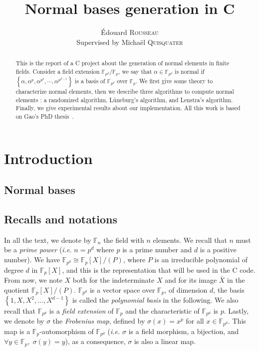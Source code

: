 \documentclass[a4paper,11pt]{article}
\title{Normal bases generation in C}
\author{Édouard \textsc{Rousseau}\\Supervised by Michaël \textsc{Quisquater}}
\theoremstyle{break}
\theoremstyle{sc}
\theoremstyle{definition}
\theoremstyle{remark}
\newcommand{\ie}{\emph{i.e. }}
\begin{document}
\maketitle

\begin{abstract}
  This is the report of a C project about the generation of normal elements in
  finite fields. Consider a field extension $\mathbb{F}_{p^d}/\mathbb{F}_p$, we
  say that $\alpha\in\mathbb{F}_{p^d}$ is normal if $\left\{
  \alpha,\alpha^p,\alpha^{p^2},\cdots,\alpha^{p^{d-1}} \right\}$ is a basis of
  $\mathbb{F}_{p^d}$ over $\mathbb{F}_p$. We first give some theory to
  characterize normal elements, then we describe three algorithms to compute
  normal elements : a randomized algorithm, Lüneburg's algorithm, and
  Lenstra's algorithm. Finally, we give experimental results about our
  implementation. All this work is based on Gao's PhD thesis~\cite{Ga93}.

\end{abstract}

\tableofcontents

\clearpage

\section{Introduction}
\subsection{Normal bases}
\subsection{Recalls and notations}
In all the text, we denote by $\mathbb{F}_n$ the field with $n$ elements. We
recall that $n$ must be a \emph{prime power} (\ie $n=p^d$ where $p$ is a prime
number and $d$ is a positive number). We have
$\mathbb{F}_{p^d}\cong\mathbb{F}_p[X]/(P)$, where $P$ is an irreducible
polynomial of degree $d$ in $\mathbb{F}_p[X]$, and this is the representation
that will be used in the C code. From now, we note
$X$ both for the indeterminate $X$ and for its image $\bar X$ in the
quotient $\mathbb{F}_p[X]/(P)$. $\mathbb{F}_{p^d}$ is a vector space over
$\mathbb{F}_p$, of dimension $d$, the basis $\left\{ 1, X, X^2, \dots, 
X^{d-1} \right\}$ is called the \emph{polynomial basis} in the following. We also recall
that $\mathbb{F}_{p^d}$ is a \emph{field extension} of $\mathbb{F}_p$ and the
characteristic of $\mathbb{F}_{p^d}$ is $p$. Lastly, we denote by $\sigma$ the
\emph{Frobenius map}, defined by $\sigma(x)=x^p$ for all
$x\in\mathbb{F}_{p^d}$. This map is a $\mathbb{F}_p$-automorphism of
$\mathbb{F}_{p^d}$ (\ie $\sigma$ is a field morphism, a bijection, and $\forall
y\in\mathbb{F}_p,\;\sigma(y)=y$), as a consequence, $\sigma$ is also a linear
map.
\end{document}
